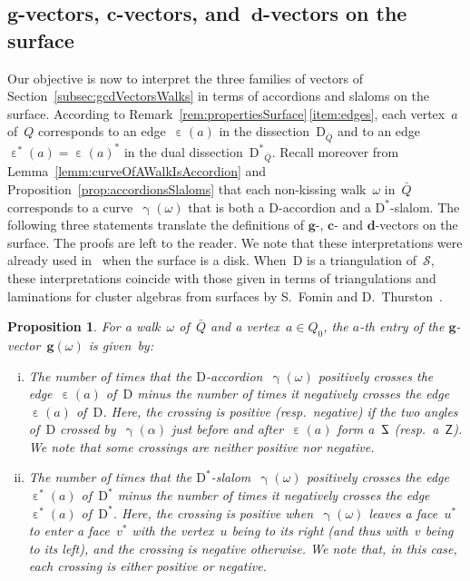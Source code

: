 \documentclass{amsart}
\newtheorem{proposition}[theorem]{Proposition}
\theoremstyle{definition}
\renewcommand{\b}[1]{\mathbf{#1}} %
\newcommand{\surface}{\mathcal{S}} %
\newcommand{\dual}{^*} %
\newcommand{\dissection}{\mathrm{D}} %
\newcommand{\curveof}{\operatorname{\gamma}} %
\newcommand{\edgeof}{\operatorname{\varepsilon}} %
\newcommand{\dualedgeof}{\operatorname{\varepsilon}\dual} %
\DeclareRobustCommand{\SSS}{\reflectbox{$\mathsf{Z}$}} %
\DeclareRobustCommand{\ZZZ}{\mathsf{Z}} %
\newcommand{\gvector}[1]{\mathbf{g}(#1)} %
\begin{document}
\subsection{$\b{g}$-vectors, $\b{c}$-vectors, and~$\b{d}$-vectors on the surface}
\label{subsec:gcdVectorsSurface}

Our objective is now to interpret the three families of vectors of Section~\ref{subsec:gcdVectorsWalks} in terms of accordions and slaloms on the surface.
According to Remark~\ref{rem:propertiesSurface}\,\eqref{item:edges}, each vertex~$a$ of~$Q$ corresponds to an edge~$\edgeof(a)$ in the dissection~$\dissection_{\bar Q}$ and  to an edge~$\dualedgeof(a) = \edgeof(a)\dual$ in the dual dissection~${\dissection\dual\!\!_{\bar Q}}$.
Recall moreover from Lemma~\ref{lemm:curveOfAWalkIsAccordion} and Proposition~\ref{prop:accordionsSlaloms} that each non-kissing walk~$\omega$ in~$\bar Q$ corresponds to a curve~$\curveof(\omega)$ that is both a $\dissection$-accordion and a $\dissection\dual$-slalom.
The following three statements translate the definitions of $\b{g}$-, $\b{c}$- and $\b{d}$-vectors on the surface.
The proofs are left to the reader.
We note that these interpretations were already used in~\cite{MannevillePilaud-accordion, GarverMcConville} when the surface is a disk.
When~$\dissection$ is a triangulation of~$\surface$, these interpretations coincide with those given in terms of triangulations and laminations for cluster algebras from surfaces by S.~Fomin and D.~Thurston~\cite{FominThurston}.

\begin{proposition}
\label{prop:gVectorsSurface}
For a walk~$\omega$ of~$\bar Q$ and a vertex~$a \in Q_0$, the $a$-th entry of the $\b{g}$-vector~$\gvector{\omega}$ is given~by:
\begin{enumerate}[(i)]
\item The number of times that the $\dissection$-accordion~$\curveof(\omega)$ positively crosses the edge~$\edgeof(a)$ of~$\dissection$ minus the number of times it negatively crosses the edge~$\edgeof(a)$ of~$\dissection$. Here, the crossing is positive (resp.~negative) if the two angles of~$\dissection$ crossed by~$\curveof(\alpha)$ just before and after~$\edgeof(a)$ form a~$\SSS$ (resp.~a~$\ZZZ$).
We note that some crossings are neither positive nor negative.
\item The number of times that the $\dissection\dual$-slalom~$\curveof(\omega)$ positively crosses the edge~$\dualedgeof(a)$ of~$\dissection\dual$ minus the number of times it negatively crosses the edge~$\dualedgeof(a)$ of~$\dissection\dual$. Here, the crossing is positive when~$\curveof(\omega)$ leaves a face~$u\dual$ to enter a face~$v\dual$ with the vertex~$u$ being to its right (and thus with~$v$ being to its left), and the crossing is negative otherwise.
We note that, in this case, each crossing is either positive or negative.
\end{enumerate}
\end{proposition}
\end{document}
